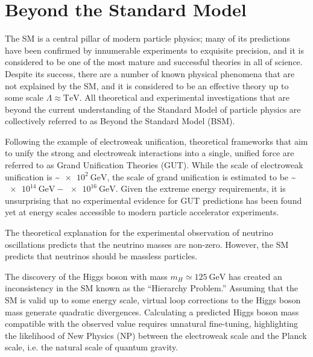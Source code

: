 \section{Beyond the Standard Model}
The SM is a central pillar of modern particle physics; many of its predictions have been confirmed by innumerable experiments to exquisite precision, and it is considered to be one of the most mature and successful theories in all of science.
Despite its success, there are a number of known physical phenomena that are not explained by the SM, and it is considered to be an effective theory up to some scale $\Lambda \approx \si{\TeV}$.
All theoretical and experimental investigations that are beyond the current understanding of the Standard Model of particle physics are collectively referred to as Beyond the Standard Model (BSM).

Following the example of electroweak unification, theoretical frameworks that aim to unify the strong and electroweak interactions into a single, unified force are referred to as Grand Unification Theories (GUT).
While the scale of electroweak unification is \sim$\SI{e2}{\GeV}$, the scale of grand unification is estimated to be \sim$\SI{e14}{\GeV} - \SI{e16}{\GeV}$.
Given the extreme energy requirements, it is unsurprising that no experimental evidence for GUT predictions has been found yet at energy scales accessible to modern particle accelerator experiments.

The theoretical explanation for the experimental observation of neutrino oscillations predicts that the neutrino masses are non-zero.
However, the SM predicts that neutrinos should be massless particles. 

The discovery of the Higgs boson with mass $m_H \simeq \SI{125}{\GeV}$ has created an inconsistency in the SM known as the ``Hierarchy Problem.''
Assuming that the SM is valid up to some energy scale, virtual loop corrections to the Higgs boson mass generate quadratic divergences.
Calculating a predicted Higgs boson mass compatible with the observed value requires unnatural fine-tuning, highlighting the likelihood of New Physics (NP) between the electroweak scale and the Planck scale, i.e. the natural scale of quantum gravity.

